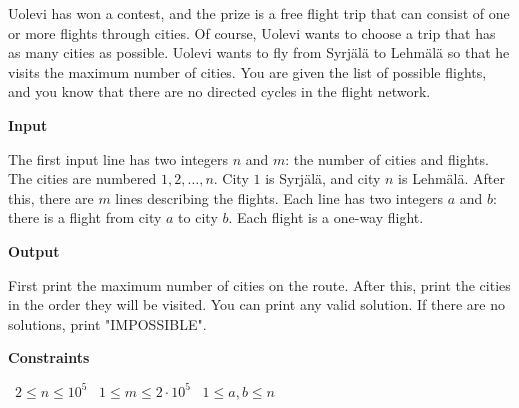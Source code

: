 Uolevi has won a contest, and the prize is a free flight trip that can consist of one or more flights through cities. Of course, Uolevi wants to choose a trip that has as many cities as possible.
Uolevi wants to fly from Syrjälä to Lehmälä so that he visits the maximum number of cities. You are given the list of possible flights, and you know that there are no directed cycles in the flight network.

\vspace{0.3cm}\noindent\textbf{Input}

The first input line has two integers $n$ and $m$: the number of cities and flights. The cities are numbered $1,2,\dots,n$. City $1$ is Syrjälä, and city $n$ is Lehmälä.
After this, there are $m$ lines describing the flights. Each line has two integers $a$ and $b$: there is a flight from city $a$ to city $b$. Each flight is a one-way flight.

\vspace{0.3cm}\noindent\textbf{Output}

First print the maximum number of cities on the route. After this, print the cities in the order they will be visited. You can print any valid solution.
If there are no solutions, print "IMPOSSIBLE".

\vspace{0.3cm}\noindent\textbf{Constraints}

\textbullet\ $2 \le n \le 10^5$
\textbullet\ $1 \le m \le 2 \cdot 10^5$
\textbullet\ $1 \le a,b \le n$